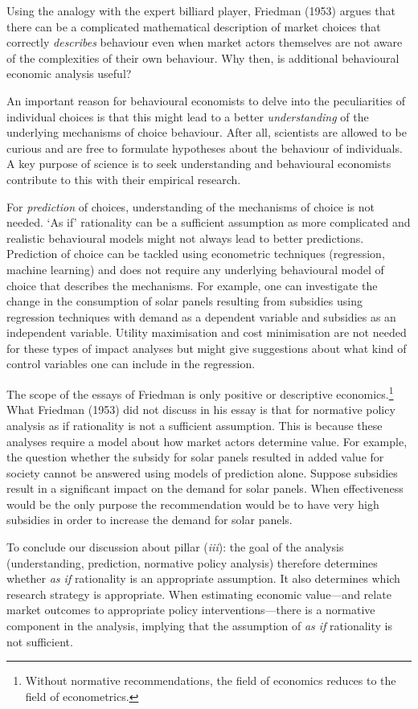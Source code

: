 \documentclass[
]{book}
\begin{document}
Using the analogy with the expert billiard player, Friedman (1953) argues that there can be a complicated mathematical description of market choices that correctly \emph{describes} behaviour even when market actors themselves are not aware of the complexities of their own behaviour. Why then, is additional behavioural economic analysis useful?

An important reason for behavioural economists to delve into the peculiarities of individual choices is that this might lead to a better \emph{understanding} of the underlying mechanisms of choice behaviour. After all, scientists are allowed to be curious and are free to formulate hypotheses about the behaviour of individuals. A key purpose of science is to seek understanding and behavioural economists contribute to this with their empirical research.

For \emph{prediction} of choices, understanding of the mechanisms of choice is not needed. `As if' rationality can be a sufficient assumption as more complicated and realistic behavioural models might not always lead to better predictions. Prediction of choice can be tackled using econometric techniques (regression, machine learning) and does not require any underlying behavioural model of choice that describes the mechanisms. For example, one can investigate the change in the consumption of solar panels resulting from subsidies using regression techniques with demand as a dependent variable and subsidies as an independent variable. Utility maximisation and cost minimisation are not needed for these types of impact analyses but might give suggestions about what kind of control variables one can include in the regression.

The scope of the essays of Friedman is only positive or descriptive economics.\footnote{Without normative recommendations, the field of economics reduces to the field of econometrics.} What Friedman (1953) did not discuss in his essay is that for normative policy analysis as if rationality is not a sufficient assumption. This is because these analyses require a model about how market actors determine value. For example, the question whether the subsidy for solar panels resulted in added value for society cannot be answered using models of prediction alone. Suppose subsidies result in a significant impact on the demand for solar panels. When effectiveness would be the only purpose the recommendation would be to have very high subsidies in order to increase the demand for solar panels.

To conclude our discussion about pillar (\emph{iii}): the goal of the analysis (understanding, prediction, normative policy analysis) therefore determines whether \emph{as if} rationality is an appropriate assumption. It also determines which research strategy is appropriate. When estimating economic value---and relate market outcomes to appropriate policy interventions---there is a normative component in the analysis, implying that the assumption of \emph{as if} rationality is not sufficient.
\end{document}
